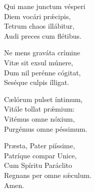  Qui mane junctum vésperi\\
 Diem vocári prǽcipis,\\
 Tetrum chaos illábitur,\\ 
 Audi preces cum flétibus. 

Ne mens graváta crímine\\
Vitæ sit exsul múnere,\\
Dum nil perénne cógitat,\\
Seséque culpis ílligat. 

 Cælórum pulset íntimum,\\
Vitále tollat prǽmium:\\
Vitémus omne nóxium,\\
Purgémus omne péssimum. 

Præsta, Pater piíssime,\\
Patríque compar Unice,\\
Cum Spíritu Paráclito\\
Regnans per omne sǽculum.\\
Amen. 